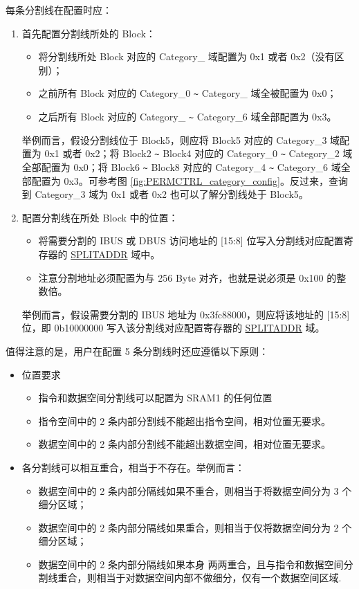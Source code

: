 \documentclass[main\_\_CN.tex]{subfiles}
\begin{document}
每条分割线在配置时应：
\begin{enumerate}
    \item 首先配置分割线所处的 Block：
    \begin{itemize}
        \item 将分割线所处 Block 对应的 Category\_ 域配置为 0x{}1 或者 0x{}2（没有区别）；
        \item 之前所有 Block 对应的 Category\_0 \verb+~+ Category\_ 域全被配置为 0x{}0；
        \item 之后所有 Block 对应的 Category\_ \verb+~+ Category\_6 域全部配置为 0x{}3。
    \end{itemize}
        举例而言，假设分割线位于 Block5，则应将 Block5 对应的 Category\_3 域配置为 0x{}1 或者 0x{}2；将 Block2 \verb+~+ Block4 对应的 Category\_0 \verb+~+ Category\_2 域全部配置为 0x{}0；将 Block6 \verb+~+ Block8 对应的 Category\_4 \verb+~+ Category\_6 域全部配置为 0x{}3。可参考图 \ref{fig:PERMCTRL_category_config}。反过来，查询到 Category\_3 域为 0x{}1 或者 0x{}2 也可以了解分割线处于 Block5。
    \item 配置分割线在所处 Block 中的位置：
    \begin{itemize}
        \item 将需要分割的 IBUS 或 DBUS 访问地址的 [15:8] 位写入分割线对应配置寄存器的 \hyperref[fielddesc:PMSCOREXIRAM0SRAMLINE0SPLITADDR]{SPLITADDR} 域中。
        \item 注意分割地址必须配置为与 256 Byte 对齐，也就是说必须是 0x{}100 的整数倍。
    \end{itemize}
        举例而言，假设需要分割的 IBUS 地址为 0x{}3fc88000，则应将该地址的 [15:8] 位，即 0b10000000 写入该分割线对应配置寄存器的 \hyperref[fielddesc:PMSCOREXIRAM0SRAMLINE0SPLITADDR]{SPLITADDR} 域。
\end{enumerate}

值得注意的是，用户在配置 5 条分割线时还应遵循以下原则：

 \begin{itemize}
     \item 位置要求
     \begin{itemize}
         \item 指令和数据空间分割线可以配置为 SRAM1 的任何位置
         \item 指令空间中的 2 条内部分割线不能超出指令空间，相对位置无要求。
         \item 数据空间中的 2 条内部分割线不能超出数据空间，相对位置无要求。
     \end{itemize}
     \item 各分割线可以相互重合，相当于不存在。举例而言：
     \begin{itemize}
         \item 数据空间中的 2 条内部分隔线如果不重合，则相当于将数据空间分为 3 个细分区域；
         \item 数据空间中的 2 条内部分隔线如果重合，则相当于仅将数据空间分为 2 个细分区域；
         \item 数据空间中的 2 条内部分隔线如果本身 两两重合，且与指令和数据空间分割线重合，则相当于对数据空间内部不做细分，仅有一个数据空间区域.
     \end{itemize}
     \end{itemize}
\end{document}

